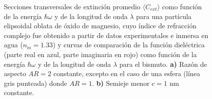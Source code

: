 \begin{figure}[H]
	\quad%
	\caption{Secciones transversales de extinción promedio $\langle C_{ext}\rangle$ como función de la energía $\hbar\omega$ y de la longitud de onda $\lambda$ para una partícula elipsoidal oblata de óxido de magnesio, cuyo índice de refracción complejo fue obtenido a partir de datos experimentales  e inmersa en agua ($n_m=1.33$) y curvas de comparación de la función dieléctrica (parte real en azul, parte imaginaria en rojo) como función de la energía $\hbar\omega$ y de la longitud de onda $\lambda$ para el bismuto. \textbf{a)} Razón de aspecto $AR=2$ constante, excepto en el caso de una esfera (línea gris punteada) donde $AR=1$. \textbf{b)} Semieje menor $c=1$ nm constante.}\label{fig:test}
\end{figure}






